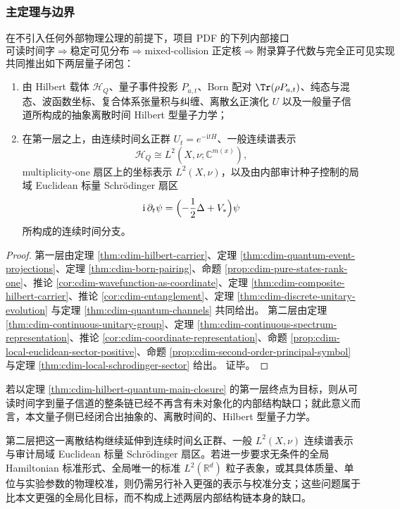 \subsubsection{主定理与边界}
\begin{theorem}\label{thm:cdim-hilbert-quantum-main-closure}
在不引入任何外部物理公理的前提下，项目 PDF 的下列内部接口
\[
\text{可读时间字}
\Longrightarrow
\text{稳定可见分布}
\Longrightarrow
\text{mixed-collision 正定核}
\Longrightarrow
\text{附录算子代数与完全正可见实现}
\]
共同推出如下两层量子闭包：
\begin{enumerate}
  \item 由 Hilbert 载体 \(\mathcal H_Q\)、量子事件投影 \(P_{a,t}\)、Born 配对 \(\Tr(\rho P_{a,t})\)、纯态与混态、波函数坐标、复合体系张量积与纠缠、离散幺正演化 \(U\) 以及一般量子信道所构成的抽象离散时间 Hilbert 型量子力学；
  \item 在第一层之上，由连续时间幺正群 \(U_t=e^{-\mathrm itH}\)、一般连续谱表示
  \[
  \mathcal H_Q\cong L^2(X,\nu;\mathbb C^{m(x)}),
  \]
  multiplicity-one 扇区上的坐标表示 \(L^2(X,\nu)\)，以及由内部审计种子控制的局域 Euclidean 标量 Schr\"odinger 扇区
\[
\mathrm i\,\partial_t\psi
=
\Bigl(-\frac12\Delta+V_\ast\Bigr)\psi
\]
  所构成的连续时间分支。
\end{enumerate}
\end{theorem}
\begin{proof}
第一层由定理 \ref{thm:cdim-hilbert-carrier}、定理 \ref{thm:cdim-quantum-event-projections}、定理 \ref{thm:cdim-born-pairing}、命题 \ref{prop:cdim-pure-states-rank-one}、推论 \ref{cor:cdim-wavefunction-as-coordinate}、定理 \ref{thm:cdim-composite-hilbert-carrier}、推论 \ref{cor:cdim-entanglement}、定理 \ref{thm:cdim-discrete-unitary-evolution} 与定理 \ref{thm:cdim-quantum-channels} 共同给出。
第二层由定理 \ref{thm:cdim-continuous-unitary-group}、定理 \ref{thm:cdim-continuous-spectrum-representation}、推论 \ref{cor:cdim-coordinate-representation}、命题 \ref{prop:cdim-local-euclidean-sector-positive}、命题 \ref{prop:cdim-second-order-principal-symbol} 与定理 \ref{thm:cdim-local-schrodinger-sector} 给出。
证毕。
\end{proof}

\begin{remark}[该闭包的精确边界]\label{rem:cdim-hilbert-quantum-boundary}
若以定理 \ref{thm:cdim-hilbert-quantum-main-closure} 的第一层终点为目标，则从可读时间字到量子信道的整条链已经不再含有未对象化的内部结构缺口；就此意义而言，本文量子侧已经闭合出抽象的、离散时间的、Hilbert 型量子力学。

第二层把这一离散结构继续延伸到连续时间幺正群、一般 \(L^2(X,\nu)\) 连续谱表示与审计局域 Euclidean 标量 Schr\"odinger 扇区。若进一步要求无条件的全局 Hamiltonian 标准形式、全局唯一的标准 \(L^2(\mathbb R^d)\) 粒子表象，或其具体质量、单位与实验参数的物理校准，则仍需另行补入更强的表示与校准分支；这些问题属于比本文更强的全局化目标，而不构成上述两层内部结构链本身的缺口。
\end{remark}

\endinput
